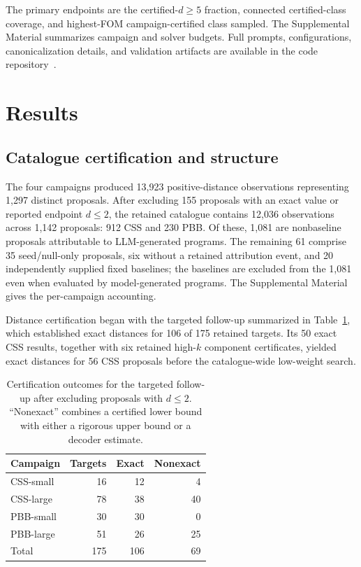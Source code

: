 \documentclass[aps,prx,twocolumn,superscriptaddress,nofootinbib,floatfix]{revtex4-2}
\begin{document}
The primary endpoints are the certified-$d\geq5$ fraction, connected
certified-class coverage, and highest-FOM campaign-certified class sampled.
The Supplemental Material summarizes campaign and solver budgets.  Full
prompts, configurations, canonicalization details, and validation artifacts
are available in the code repository~\cite{cruzbenito2026qcode}.

\section{Results}

\subsection{Catalogue certification and structure}
\label{sec:catalogue-results}

The four campaigns produced 13,923 positive-distance observations representing
1,297 distinct proposals.  After excluding 155 proposals with an exact value
or reported endpoint $d\leq2$, the retained catalogue contains 12,036 observations across
1,142 proposals: 912 CSS and 230 PBB.  Of these, 1,081 are nonbaseline
proposals attributable to LLM-generated programs.  The remaining 61 comprise
35 seed/null-only proposals, six without a retained attribution event, and 20
independently supplied fixed baselines; the baselines are excluded from the
1,081 even when evaluated by model-generated programs.  The Supplemental
Material gives the per-campaign accounting.

Distance certification began with the targeted follow-up summarized in
Table~\ref{tab:certification-outcomes}, which established exact distances for
106 of 175 retained targets.  Its 50 exact CSS results, together with six
retained high-$k$ component certificates, yielded exact distances for 56 CSS
proposals before the catalogue-wide low-weight search.

\begin{table}[tbp]
\centering
\caption{Certification outcomes for the targeted follow-up after
excluding proposals with $d\leq2$.  ``Nonexact'' combines a certified lower
bound with either a rigorous upper bound or a decoder estimate.}
\label{tab:certification-outcomes}
\begin{tabular}{lrrr}
\toprule
Campaign & Targets & Exact & Nonexact\\
\midrule
CSS-small & 16 & 12 & 4\\
CSS-large & 78 & 38 & 40\\
PBB-small & 30 & 30 & 0\\
PBB-large & 51 & 26 & 25\\
\midrule
Total & 175 & 106 & 69\\
\bottomrule
\end{tabular}
\end{table}
\end{document}
